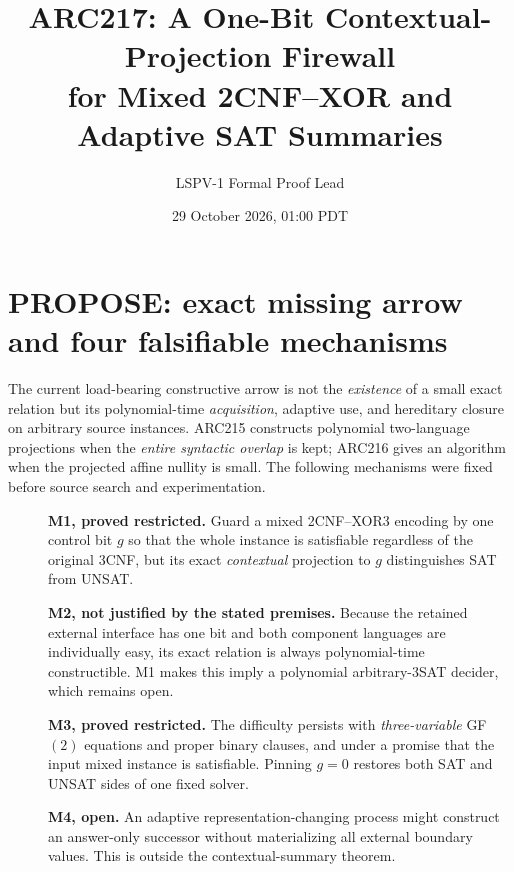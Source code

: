 \documentclass[11pt]{article}
\title{ARC217: A One-Bit Contextual-Projection Firewall\\for Mixed 2CNF--XOR and Adaptive SAT Summaries}
\author{LSPV-1 Formal Proof Lead}
\date{29 October 2026, 01:00 PDT}
\begin{document}
\maketitle
\begin{center}\end{center}

\section{PROPOSE: exact missing arrow and four falsifiable mechanisms}
The current load-bearing constructive arrow is not the \emph{existence} of a small exact relation but its polynomial-time \emph{acquisition}, adaptive use, and hereditary closure on arbitrary source instances. ARC215 constructs polynomial two-language projections when the \emph{entire syntactic overlap} is kept; ARC216 gives an algorithm when the projected affine nullity is small. The following mechanisms were fixed before source search and experimentation.
\begin{description}
\item[]\textbf{M1, proved restricted.} Guard a mixed 2CNF--XOR3 encoding by one control bit $g$ so that the whole instance is satisfiable regardless of the original $3$CNF, but its exact \emph{contextual} projection to $g$ distinguishes SAT from UNSAT.
\item[]\textbf{M2, not justified by the stated premises.} Because the retained external interface has one bit and both component languages are individually easy, its exact relation is always polynomial-time constructible. M1 makes this imply a polynomial arbitrary-3SAT decider, which remains open.
\item[]\textbf{M3, proved restricted.} The difficulty persists with \emph{three-variable} GF$(2)$ equations and proper binary clauses, and under a promise that the input mixed instance is satisfiable. Pinning $g=0$ restores both SAT and UNSAT sides of one fixed solver.
\item[]\textbf{M4, open.} An adaptive representation-changing process might construct an answer-only successor without materializing all external boundary values. This is outside the contextual-summary theorem.
\end{description}
\end{document}
